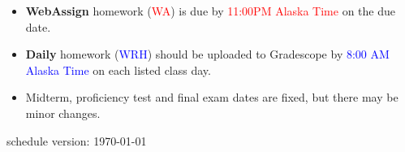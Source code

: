 \documentclass[12pt]{article}
\begin{document}
\begin{itemize}
\item \textbf{WebAssign} homework (\textcolor{red}{WA}) is due by \textcolor{red}{11:00PM Alaska Time} on the due date.
\item \textbf{Daily} homework (\textcolor{blue}{WRH}) should be uploaded to Gradescope by \textcolor{blue}{8:00 AM Alaska Time} on each listed class day.
\item Midterm, proficiency test and final exam dates are fixed, but there may be minor changes.
\end{itemize}




\vfill
\hfill \scriptsize schedule version: \today \normalsize
\end{document}

